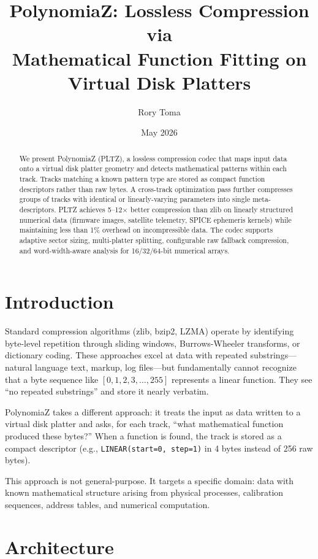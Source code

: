 \documentclass[11pt,a4paper]{article}
\title{\textbf{PolynomiaZ: Lossless Compression via\\Mathematical Function Fitting on Virtual Disk Platters}}
\author{Rory Toma}
\date{May 2026}
\begin{document}
\maketitle

\begin{abstract}
We present PolynomiaZ (PLTZ), a lossless compression codec that maps input data onto a virtual disk platter geometry and detects mathematical patterns within each track. Tracks matching a known pattern type are stored as compact function descriptors rather than raw bytes. A cross-track optimization pass further compresses groups of tracks with identical or linearly-varying parameters into single meta-descriptors. PLTZ achieves 5--12$\times$ better compression than zlib on linearly structured numerical data (firmware images, satellite telemetry, SPICE ephemeris kernels) while maintaining less than 1\% overhead on incompressible data. The codec supports adaptive sector sizing, multi-platter splitting, configurable raw fallback compression, and word-width-aware analysis for 16/32/64-bit numerical arrays.
\end{abstract}

\section{Introduction}

Standard compression algorithms (zlib, bzip2, LZMA) operate by identifying byte-level repetition through sliding windows, Burrows-Wheeler transforms, or dictionary coding. These approaches excel at data with repeated substrings---natural language text, markup, log files---but fundamentally cannot recognize that a byte sequence like $[0, 1, 2, 3, \ldots, 255]$ represents a linear function. They see ``no repeated substrings'' and store it nearly verbatim.

PolynomiaZ takes a different approach: it treats the input as data written to a virtual disk platter and asks, for each track, ``what mathematical function produced these bytes?'' When a function is found, the track is stored as a compact descriptor (e.g., \texttt{LINEAR(start=0, step=1)} in 4 bytes instead of 256 raw bytes).

This approach is not general-purpose. It targets a specific domain: data with known mathematical structure arising from physical processes, calibration sequences, address tables, and numerical computation.

\section{Architecture}
\end{document}
